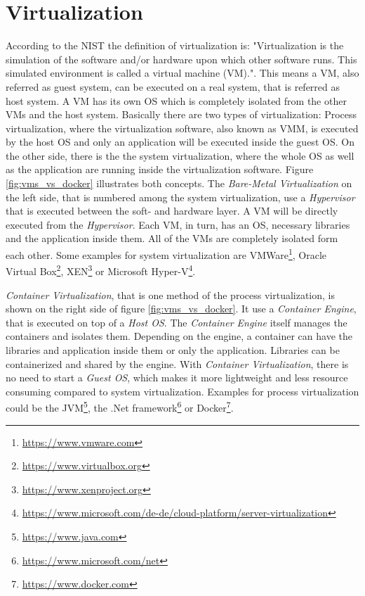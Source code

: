 \section{Virtualization}
\label{section:state_virtualization}
According to the \ac{NIST} the definition of virtualization is: "Virtualization is the simulation of the software and/or hardware upon which other software runs. This simulated environment is called a virtual machine (VM)."\autocite[p. ES-1]{Sca:2011}.
This means a \ac{VM}, also referred as guest system, can be executed on a real system, that is referred as host system.
A \ac{VM} has its own \ac{OS} which is completely isolated from the other \acp{VM} and the host system.\autocite[cf.][p. 2]{Celesti:2016}
Basically there are two types of virtualization: Process virtualization, where the virtualization software, also known as \ac{VMM}, is executed by the host \ac{OS} and only an application will be executed inside the guest \ac{OS}.
On the other side, there is the the system virtualization, where the whole \ac{OS} as well as the application are running inside the virtualization software.
Figure \ref{fig:vms_vs_docker} illustrates both concepts.
The \textit{Bare-Metal Virtualization} on the left side, that is numbered among the system virtualization, use a \textit{Hypervisor} that is executed between the soft- and hardware layer.\autocite[cf.][p. 1771]{Manik:2016}
A \ac{VM} will be directly executed from the \textit{Hypervisor}.
Each \ac{VM}, in turn, has an \ac{OS}, necessary libraries and the application inside them.
All of the \acp{VM} are completely isolated form each other.\autocite[cf.][p.275]{Soltesz:2007}
Some examples for system virtualization are VMWare\footnote{\url{https://www.vmware.com}}, Oracle Virtual Box\footnote{\url{https://www.virtualbox.org}}, XEN\footnote{\url{https://www.xenproject.org}} or Microsoft Hyper-V\footnote{\url{https://www.microsoft.com/de-de/cloud-platform/server-virtualization}}.

\textit{Container Virtualization}, that is one method of the process virtualization, is shown on the right side of figure \ref{fig:vms_vs_docker}.
It use a \textit{Container Engine}, that is executed on top of a \textit{Host \ac{OS}}.
The \textit{Container Engine} itself manages the containers and isolates them.\autocite[cf.][p. 1]{Celesti:2016}
Depending on the engine, a container can have the libraries and application inside them or only the application.
Libraries can be containerized and shared by the engine.
With \textit{Container Virtualization}, there is no need to start a \textit{Guest \ac{OS}}, which makes it more lightweight and less resource consuming compared to system virtualization.\autocite[cf.][p. 2 ff.]{Celesti:2016}\autocite[cf.][p. 1]{Raho:2015}
Examples for process virtualization could be the \ac{JVM}\footnote{\url{https://www.java.com}}, the .Net framework\footnote{\url{https://www.microsoft.com/net}} or Docker\footnote{\url{https://www.docker.com}}.

